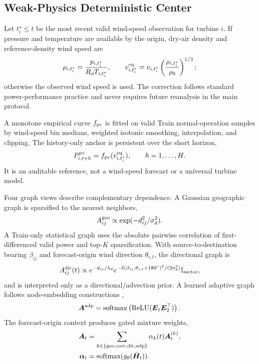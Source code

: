 \documentclass[journal]{IEEEtran}
\newcommand{\ind}{\mathbb{I}}
\begin{document}
\subsection{Weak-Physics Deterministic Center}

Let $t_i^\star\leq t$ be the most recent valid wind-speed observation for turbine $i$. If pressure and temperature are available by the origin, dry-air density and reference-density wind speed are
\begin{equation}
\rho_{i,t_i^\star}=\frac{p_{i,t_i^\star}}{R_dT_{i,t_i^\star}},
\qquad
v^{\rm eq}_{i,t_i^\star}=v_{i,t_i^\star}
\left(\frac{\rho_{i,t_i^\star}}{\rho_0}\right)^{1/3};
\label{eq:density}
\end{equation}
otherwise the observed wind speed is used. The correction follows standard power-performance practice \cite{lee2020pcwg} and never requires future reanalysis in the main protocol.

A monotone empirical curve $f_{\rm pc}$ is fitted on valid Train normal-operation samples by wind-speed bin medians, weighted isotonic smoothing, interpolation, and clipping. The history-only anchor is persistent over the short horizon,
\begin{equation}
P^{\rm pc}_{i,t+h}=f_{\rm pc}(v^{\rm eq}_{i,t_i^\star}),
\qquad h=1,\ldots,H.
\label{eq:pc_anchor}
\end{equation}
It is an auditable reference, not a wind-speed forecast or a universal turbine model.

Four graph views describe complementary dependence. A Gaussian geographic graph is sparsified to the nearest neighbors,
\begin{equation}
A^{\rm geo}_{ij}\propto\exp(-d_{ij}^2/\sigma_d^2).
\end{equation}
A Train-only statistical graph uses the absolute pairwise correlation of first-differenced valid power and top-$K$ sparsification. With source-to-destination bearing $\beta_{ij}$ and forecast-origin wind direction $\theta_{i,t}$, the directional graph is
\begin{equation}
A^{\rm dir}_{ij}(t)\propto
e^{-d_{ij}/\lambda_d}
e^{-\delta(\beta_{ij},\theta_{i,t}+180^\circ)^2/(2\sigma_\theta^2)}
\ind_{\rm sector},
\label{eq:direction_graph}
\end{equation}
and is interpreted only as a directional/advection prior. A learned adaptive graph follows node-embedding constructions \cite{wu2019graphwavenet,bai2020agcrn},
\begin{equation}
\bm A^{\rm adp}=\operatorname{softmax}
\left(\operatorname{ReLU}(\bm E_1\bm E_2^\top)\right).
\end{equation}
The forecast-origin context produces gated mixture weights,
\begin{align}
\bm A_t&=\sum_{k\in\{\rm geo,corr,dir,adp\}}
\alpha_k(t)\bm A_t^{(k)},\nonumber\\
\bm\alpha_t&=\operatorname{softmax}(g_\theta(\bar{\bm H}_t)).
\label{eq:graph_mix}
\end{align}
\end{document}

